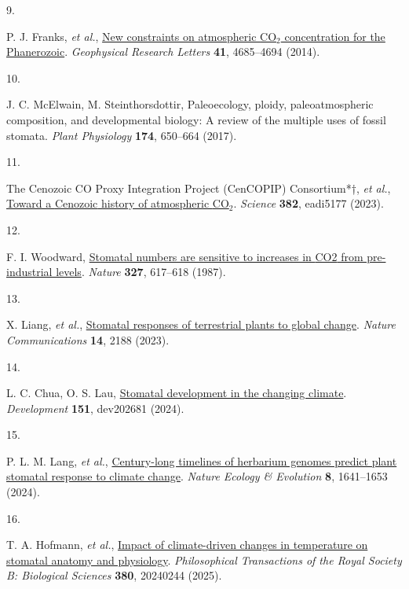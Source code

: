 \documentclass[
  letterpaper,
  DIV=11,
  numbers=noendperiod]{scrartcl}
\newlength{\cslhangindent}
\newlength{\csllabelwidth}
\newenvironment{CSLReferences}[2] %
 {\begin{list}{}{%
  \setlength{\itemindent}{0pt}
  \setlength{\leftmargin}{0pt}
  \setlength{\parsep}{0pt}
  \ifodd #1
   \setlength{\leftmargin}{\cslhangindent}
   \setlength{\itemindent}{-1\cslhangindent}
  \fi
  \setlength{\itemsep}{#2\baselineskip}}}
 {\end{list}}
\newcommand{\CSLLeftMargin}[1]{\parbox[t]{\csllabelwidth}{\strut#1\strut}}
\newcommand{\CSLRightInline}[1]{\parbox[t]{\linewidth - \csllabelwidth}{\strut#1\strut}}
\begin{document}
\begin{CSLReferences}{0}{1}
\CSLLeftMargin{9. }%
\CSLRightInline{P. J. Franks, \emph{et al.},
\href{https://doi.org/10.1002/2014GL060457}{New constraints on
atmospheric {CO}\(_{\textrm{2}}\) concentration for the {Phanerozoic}}.
\emph{Geophysical Research Letters} \textbf{41}, 4685--4694 (2014).}

\CSLLeftMargin{10. }%
\CSLRightInline{J. C. McElwain, M. Steinthorsdottir, Paleoecology,
ploidy, paleoatmospheric composition, and developmental biology: A
review of the multiple uses of fossil stomata. \emph{Plant Physiology}
\textbf{174}, 650--664 (2017).}

\CSLLeftMargin{11. }%
\CSLRightInline{The Cenozoic CO Proxy Integration Project (CenCOPIP)
Consortium*†, \emph{et al.},
\href{https://doi.org/10.1126/science.adi5177}{Toward a {Cenozoic}
history of atmospheric {CO}\(_{\textrm{2}}\)}. \emph{Science}
\textbf{382}, eadi5177 (2023).}

\CSLLeftMargin{12. }%
\CSLRightInline{F. I. Woodward,
\href{https://doi.org/10.1038/327617a0}{Stomatal numbers are sensitive
to increases in {CO2} from pre-industrial levels}. \emph{Nature}
\textbf{327}, 617--618 (1987).}

\CSLLeftMargin{13. }%
\CSLRightInline{X. Liang, \emph{et al.},
\href{https://doi.org/10.1038/s41467-023-37934-7}{Stomatal responses of
terrestrial plants to global change}. \emph{Nature Communications}
\textbf{14}, 2188 (2023).}

\CSLLeftMargin{14. }%
\CSLRightInline{L. C. Chua, O. S. Lau,
\href{https://doi.org/10.1242/dev.202681}{Stomatal development in the
changing climate}. \emph{Development} \textbf{151}, dev202681 (2024).}

\CSLLeftMargin{15. }%
\CSLRightInline{P. L. M. Lang, \emph{et al.},
\href{https://doi.org/10.1038/s41559-024-02481-x}{Century-long timelines
of herbarium genomes predict plant stomatal response to climate change}.
\emph{Nature Ecology \& Evolution} \textbf{8}, 1641--1653 (2024).}

\CSLLeftMargin{16. }%
\CSLRightInline{T. A. Hofmann, \emph{et al.},
\href{https://doi.org/10.1098/rstb.2024.0244}{Impact of climate-driven
changes in temperature on stomatal anatomy and physiology}.
\emph{Philosophical Transactions of the Royal Society B: Biological
Sciences} \textbf{380}, 20240244 (2025).}


\end{CSLReferences}
\end{document}
